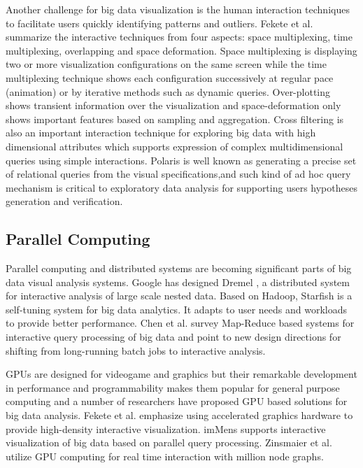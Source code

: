\documentclass[journal]{vgtc}                %
\begin{document}
{Another challenge for big data visualization is the human interaction techniques to facilitate users quickly identifying patterns and outliers. Fekete et al. \cite{Fekete:2002} summarize the interactive techniques from four aspects:
space multiplexing, time multiplexing, overlapping and space deformation. Space multiplexing is displaying two or more visualization configurations on the same screen while the time multiplexing technique shows each configuration successively at regular pace (animation) or by iterative methods such as dynamic queries. Over-plotting shows transient information over the visualization and space-deformation only shows important features based on sampling and aggregation. Cross filtering \cite{weaver2010cross} is also an important interaction technique for exploring big data with high dimensional attributes which supports expression of complex multidimensional queries using simple interactions. Polaris \cite{stolte2002polaris} is well known as generating a precise set of relational queries from the visual specifications,and such kind of ad hoc query mechanism is critical to exploratory data analysis for supporting users hypotheses generation and verification.



\subsection{Parallel Computing}
Parallel computing and distributed systems are becoming significant parts of big data visual analysis systems.  Google has designed Dremel \cite{melnik2010dremel}, a distributed system for interactive analysis of large scale nested data. Based on Hadoop, Starfish \cite{herodotou} is a self-tuning system for big data analytics. It adapts to user needs and workloads to provide better performance. Chen et al. \cite{Chen:2012} survey  Map-Reduce based systems for interactive query processing of big data and point to new design directions for shifting from long-running batch jobs to interactive analysis.

GPUs are designed for videogame and graphics but their remarkable development in performance and programmability makes them popular for general purpose computing and a number of researchers have proposed GPU based solutions for big data analysis. Fekete et al. \cite{Fekete:2002} emphasize using accelerated graphics hardware to provide high-density interactive visualization. imMens \cite{2013-immens} supports interactive visualization of big data based on parallel query processing. Zinsmaier et al. \cite{zinsmaier} utilize GPU computing for real time interaction with million node graphs.

}
\end{document}
